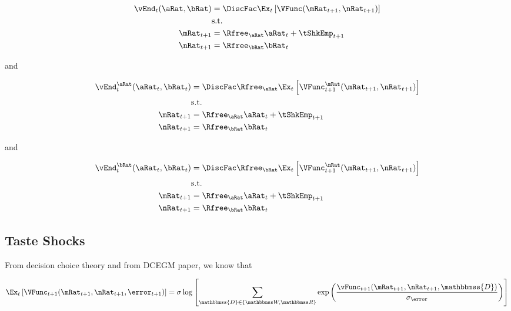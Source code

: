 \documentclass[\econtexRoot/HAFiscal]{subfiles}
\begin{document}
\begin{equation}
    \begin{split}
        \vEnd_{t}(\aRat, \bRat) & =  \DiscFac \Ex_{t} \left[
            \VFunc(\mRat_{t+1}, \nRat_{t+1}) \right] \\
        & \text{s.t.} \\
        \mRat_{t+1} & = \Rfree_{\aRat} \aRat_{t} + \tShkEmp_{t+1} \\
        \nRat_{t+1} & = \Rfree_{\bRat} \bRat_{t}
    \end{split}
\end{equation}

and

\begin{equation}
    \begin{split}
        \vEnd_{t}^{\aRat}(\aRat_{t}, \bRat_{t}) & =  \DiscFac
        \Rfree_{\aRat} \Ex_{t} \left[ \VFunc^{\mRat}_{t+1}(\mRat_{t+1},
            \nRat_{t+1})
            \right] \\
        & \text{s.t.} \\
        \mRat_{t+1} & = \Rfree_{\aRat} \aRat_{t} + \tShkEmp_{t+1} \\
        \nRat_{t+1} & = \Rfree_{\bRat} \bRat_{t}
    \end{split}
\end{equation}

and

\begin{equation}
    \begin{split}
        \vEnd_{t}^{\bRat}(\aRat_{t}, \bRat_{t}) & =  \DiscFac
        \Rfree_{\bRat} \Ex_{t} \left[ \VFunc^{\nRat}_{t+1}(\mRat_{t+1},
            \nRat_{t+1})
            \right] \\
        & \text{s.t.} \\
        \mRat_{t+1} & = \Rfree_{\aRat} \aRat_{t} + \tShkEmp_{t+1} \\
        \nRat_{t+1} & = \Rfree_{\bRat} \bRat_{t}
    \end{split}
\end{equation}

\subsection{Taste Shocks}

From decision choice theory and from DCEGM paper, we know that

\providecommand{\Decision}{\ensuremath{\mathbbmss{D}}}

\begin{equation}
    \Ex_{t} \left[
        \VFunc_{t+1}(\mRat_{t+1}, \nRat_{t+1}, \error_{t+1}) \right] =
    \sigma \log \left[ \sum_{\Decision \in \{\Work, \Retire\}} \exp \left(
        \frac{\vFunc_{t+1}(\mRat_{t+1}, \nRat_{t+1},
            \Decision)}{\sigma_\error}	\right) 	\right]
\end{equation}
\end{document}
